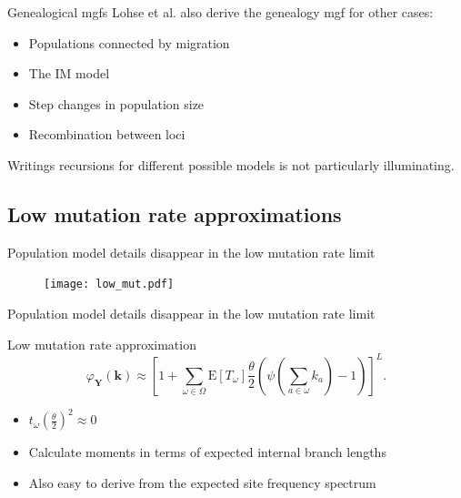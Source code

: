 \documentclass{beamer}
\newcommand{\T}{\frac{\theta}{2}}
\newcommand{\E}{\mathrm{E}}
\begin{document}
\begin{frame}{Genealogical mgfs}
  Lohse et al. also derive the genealogy mgf for other cases:
  \begin{itemize}
  \item Populations connected by migration
  \item The IM model 
  \item Step changes in population size
  \item Recombination between loci
  \end{itemize}
  Writings recursions for different possible models is not particularly
  illuminating.
\end{frame}

\subsection{Low mutation rate approximations}

\begin{frame}{Population model details disappear in the low mutation rate limit}
  \begin{figure}
    \texttt{[image: low\_mut.pdf]}        
  \end{figure}
\end{frame}

\begin{frame}{Population model details disappear in the low mutation rate limit}
  \begin{block}{Low mutation rate approximation}
    \begin{equation*}
      \varphi_{\mathbf{Y}}(\mathbf{k}) \approx \left[ 1 + \sum_{\omega \in \Omega}
        \E[T_\omega] \T \left( \psi\left( \sum_{a \in \omega} k_a\right) -1 \right) \right]^L.
    \end{equation*}
  \end{block}
  \begin{itemize}
  \item $t_\omega\left(\T\right)^2 \approx 0$
  \item Calculate moments in terms of expected internal branch lengths
  \item Also easy to derive from the expected site frequency spectrum
  \end{itemize}
\end{frame}
\end{document}
